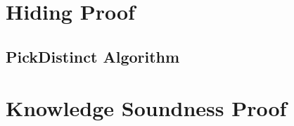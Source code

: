 \section{Hiding Proof}
\label{appendix:security:hiding}

\subsection{PickDistinct Algorithm}
\label{appendix:security:hiding:picki}

\section{Knowledge Soundness Proof}
\label{appendix:security:knowledgesound}